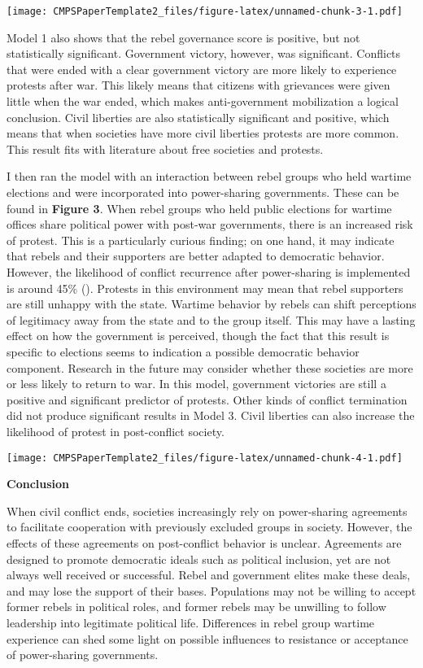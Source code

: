 \documentclass[12pt,]{article}
\begin{document}
\texttt{[image: CMPSPaperTemplate2\_files/figure-latex/unnamed-chunk-3-1.pdf]}

Model 1 also shows that the rebel governance score is positive, but not
statistically significant. Government victory, however, was significant.
Conflicts that were ended with a clear government victory are more
likely to experience protests after war. This likely means that citizens
with grievances were given little when the war ended, which makes
anti-government mobilization a logical conclusion. Civil liberties are
also statistically significant and positive, which means that when
societies have more civil liberties protests are more common. This
result fits with literature about free societies and protests.

I then ran the model with an interaction between rebel groups who held
wartime elections and were incorporated into power-sharing governments.
These can be found in \textbf{Figure 3}. When rebel groups who held
public elections for wartime offices share political power with post-war
governments, there is an increased risk of protest. This is a
particularly curious finding; on one hand, it may indicate that rebels
and their supporters are better adapted to democratic behavior. However,
the likelihood of conflict recurrence after power-sharing is implemented
is around 45\% (\citet{hartzell_institutionalizing_2008}). Protests in
this environment may mean that rebel supporters are still unhappy with
the state. Wartime behavior by rebels can shift perceptions of
legitimacy away from the state and to the group itself. This may have a
lasting effect on how the government is perceived, though the fact that
this result is specific to elections seems to indication a possible
democratic behavior component. Research in the future may consider
whether these societies are more or less likely to return to war. In
this model, government victories are still a positive and significant
predictor of protests. Other kinds of conflict termination did not
produce significant results in Model 3. Civil liberties can also
increase the likelihood of protest in post-conflict society.

\texttt{[image: CMPSPaperTemplate2\_files/figure-latex/unnamed-chunk-4-1.pdf]}

\textbf{Conclusion}

When civil conflict ends, societies increasingly rely on power-sharing
agreements to facilitate cooperation with previously excluded groups in
society. However, the effects of these agreements on post-conflict
behavior is unclear. Agreements are designed to promote democratic
ideals such as political inclusion, yet are not always well received or
successful. Rebel and government elites make these deals, and may lose
the support of their bases. Populations may not be willing to accept
former rebels in political roles, and former rebels may be unwilling to
follow leadership into legitimate political life. Differences in rebel
group wartime experience can shed some light on possible influences to
resistance or acceptance of power-sharing governments.
\end{document}
